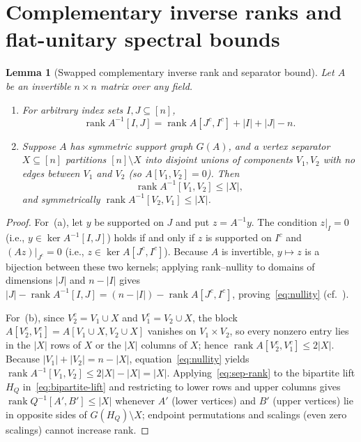 \documentclass[11pt,reqno]{amsart}
\numberwithin{equation}{section}
\newtheorem{lemma}[theorem]{Lemma}
\theoremstyle{definition}
\theoremstyle{remark}
\newcommand{\rank}{\operatorname{rank}}
\begin{document}
\section{Complementary inverse ranks and flat-unitary spectral bounds}
\label{sec:rank-spec}

\begin{lemma}[Swapped complementary inverse rank and separator bound]
\label{lem:nullity}
Let $A$ be an invertible $n\times n$ matrix over any field.
\begin{enumerate}[label=(\alph*),leftmargin=2em]
\item For arbitrary index sets $I,J\subseteq[n]$,
\begin{equation}
\label{eq:nullity}
\rank A^{-1}[I,J] = \rank A[J^c, I^c] + |I| + |J| - n.
\end{equation}
\item Suppose $A$ has symmetric support graph $G(A)$, and a vertex separator $X\subseteq[n]$ partitions $[n]\setminus X$ into disjoint unions of components $V_1,V_2$ with no edges between $V_1$ and $V_2$ (so $A[V_1,V_2]=0$). Then
\begin{equation}
\label{eq:sep-rank}
\rank A^{-1}[V_1,V_2] \le |X|,
\end{equation}
and symmetrically $\rank A^{-1}[V_2,V_1]\le |X|$.
\end{enumerate}
\end{lemma}

\begin{proof}
For~(a), let $y$ be supported on $J$ and put $z = A^{-1}y$. The condition $z|_I = 0$ (i.e., $y\in\ker A^{-1}[I,J]$) holds if and only if $z$ is supported on $I^c$ and $(Az)|_{J^c}=0$ (i.e., $z\in\ker A[J^c,I^c]$). Because $A$ is invertible, $y\mapsto z$ is a bijection between these two kernels; applying rank--nullity to domains of dimensions $|J|$ and $n-|I|$ gives $|J| - \rank A^{-1}[I,J] = (n-|I|) - \rank A[J^c,I^c]$, proving~\eqref{eq:nullity} (cf.~\cite[Corollary~1]{VV04}).

For~(b), since $V_2^c = V_1\cup X$ and $V_1^c = V_2\cup X$, the block $A[V_2^c,V_1^c] = A[V_1\cup X, V_2\cup X]$ vanishes on $V_1\times V_2$, so every nonzero entry lies in the $|X|$ rows of $X$ or the $|X|$ columns of $X$; hence $\rank A[V_2^c,V_1^c]\le 2|X|$. Because $|V_1|+|V_2|=n-|X|$, equation~\eqref{eq:nullity} yields $\rank A^{-1}[V_1,V_2]\le 2|X| - |X| = |X|$. Applying~\eqref{eq:sep-rank} to the bipartite lift $H_Q$ in~\eqref{eq:bipartite-lift} and restricting to lower rows and upper columns gives $\rank Q^{-1}[A',B']\le |X|$ whenever $A'$ (lower vertices) and $B'$ (upper vertices) lie in opposite sides of $G(H_Q)\setminus X$; endpoint permutations and scalings (even zero scalings) cannot increase rank.
\end{proof}
\end{document}
